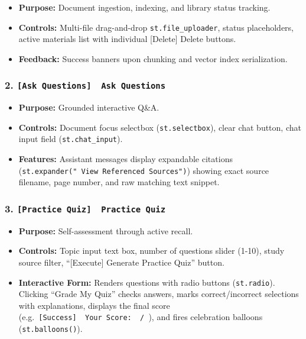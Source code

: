 \documentclass[
]{article}
\providecommand{\tightlist}{%
  \setlength{\itemsep}{0pt}\setlength{\parskip}{0pt}}
\begin{document}
\begin{itemize}
\tightlist
\item
  \textbf{Purpose:} Document ingestion, indexing, and library status
  tracking.
\item
  \textbf{Controls:} Multi-file drag-and-drop
  \texttt{st.\allowbreak file\_\allowbreak uploader}, status placeholders, active materials list
  with individual {[}Delete{]} Delete buttons.
\item
  \textbf{Feedback:} Success banners upon chunking and vector index
  serialization.
\end{itemize}

\subsubsection{\texorpdfstring{2.
\texttt{{[}Ask\ \allowbreak Questions{]}\ \allowbreak \ \allowbreak Ask\ \allowbreak Questions}}{2. {[}Ask Questions{]}  Ask Questions}}\label{ask-questions-ask-questions}

\begin{itemize}
\tightlist
\item
  \textbf{Purpose:} Grounded interactive Q\&A.
\item
  \textbf{Controls:} Document focus selectbox (\texttt{st.\allowbreak selectbox}),
  clear chat button, chat input field (\texttt{st.\allowbreak chat\_\allowbreak input}).
\item
  \textbf{Features:} Assistant messages display expandable citations
  (\texttt{st.\allowbreak expander(\allowbreak "\ \allowbreak View\ \allowbreak Referenced\ \allowbreak Sources")\allowbreak }) showing exact
  source filename, page number, and raw matching text snippet.
\end{itemize}

\subsubsection{\texorpdfstring{3.
\texttt{{[}Practice\ \allowbreak Quiz{]}\ \allowbreak \ \allowbreak Practice\ \allowbreak Quiz}}{3. {[}Practice Quiz{]}  Practice Quiz}}\label{practice-quiz-practice-quiz}

\begin{itemize}
\tightlist
\item
  \textbf{Purpose:} Self-assessment through active recall.
\item
  \textbf{Controls:} Topic input text box, number of questions slider
  (1-10), study source filter, ``{[}Execute{]} Generate Practice Quiz''
  button.
\item
  \textbf{Interactive Form:} Renders questions with radio buttons
  (\texttt{st.\allowbreak radio}). Clicking ``Grade My Quiz'' checks answers, marks
  correct/incorrect selections with explanations, displays the final
  score (e.g.~\texttt{{[}Success{]}\ \allowbreak \ \allowbreak Your\ \allowbreak Score:\ \ \allowbreak /\allowbreak \ }), and
  fires celebration balloons (\texttt{st.\allowbreak balloons(\allowbreak )\allowbreak }).
\end{itemize}
\end{document}
